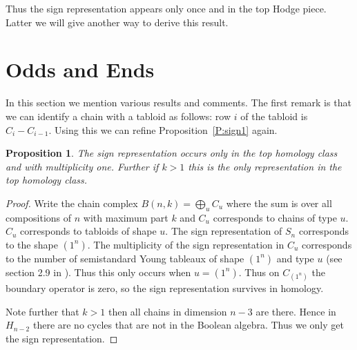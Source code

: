 \documentclass{amsart}
\newtheorem{proposition}[theorem]{Proposition}
\begin{document}
Thus the sign representation appears only once and in the top Hodge piece. Latter we will give another way to derive this 
result. 
\section{Odds and Ends} \label{S:oddend}
In this section we mention various results and comments. The first remark is that we can identify a chain with a tabloid as
follows: row $i$ of the tabloid is $C_i - C_{i-1}$. Using this we can refine Proposition~\ref{P:sign1} again. 
\begin{proposition} \label{P:sign2} The sign representation occurs only in the top homology class and with multiplicity one. 
Further if $k > 1$ this is the only representation in the top homology class.
\end{proposition}
\begin{proof} 
  Write the chain complex $B(n, k) = \bigoplus_u C_u$ 
  where the sum is over all compositions of $n$ with maximum part $k$ and $C_u$ corresponds to chains of type $u$. $C_u$ 
  corresponds to tabloids of shape $u$. The sign 
  representation of $S_n$ corresponds to the shape $(1^n)$. The multiplicity of the sign representation in $C_u$ 
  corresponds to the number of semistandard Young tableaux of shape $(1^n)$ and type $u$ (see section 2.9 in 
  \cite{Sagan}). Thus this only occurs when $u = (1^n)$. Thus on $C_{(1^n)}$ the boundary operator is zero, so the sign
  representation survives in homology.   
 
  Note further that $k > 1$ then all chains in dimension $n-3$ are there. Hence in $H_{n-2}$ there are no cycles that are
  not in the Boolean algebra. Thus we only get the sign representation.
\end{proof}
\end{document}
